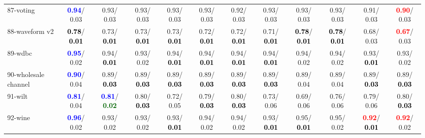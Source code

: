 \begin{table}[h]
\begin{center}
{\begin{tabular}{lc|c|c|c|c|c|c|c|c|c|c}
87-voting & \textcolor{blue}{\textbf{  0.94}}/  0.03 &   0.93/  0.03 &   0.93/  0.03 &   0.93/  0.03 &   0.93/  0.03 &   0.92/  0.03 &   0.93/  0.03 &   0.93/  0.03 &   0.93/  0.03 &   0.91/  0.03 & \textcolor{red}{\textbf{  0.90}}/  0.03 \\
88-waveform v2 & \textcolor{black}{\textbf{  0.78}}/\textcolor{black}{\textbf{  0.01}} &   0.73/\textcolor{black}{\textbf{  0.01}} &   0.73/\textcolor{black}{\textbf{  0.01}} &   0.73/\textcolor{black}{\textbf{  0.01}} &   0.72/\textcolor{black}{\textbf{  0.01}} &   0.72/\textcolor{black}{\textbf{  0.01}} &   0.71/\textcolor{black}{\textbf{  0.01}} & \textcolor{black}{\textbf{  0.78}}/\textcolor{black}{\textbf{  0.01}} & \textcolor{black}{\textbf{  0.78}}/\textcolor{black}{\textbf{  0.01}} &   0.68/  0.03 & \textcolor{red}{\textbf{  0.67}}/  0.03 \\
89-wdbc & \textcolor{blue}{\textbf{  0.95}}/  0.02 &   0.94/\textcolor{black}{\textbf{  0.01}} &   0.93/  0.02 &   0.94/\textcolor{black}{\textbf{  0.01}} &   0.94/\textcolor{black}{\textbf{  0.01}} &   0.94/\textcolor{black}{\textbf{  0.01}} &   0.94/\textcolor{black}{\textbf{  0.01}} &   0.94/  0.02 &   0.94/  0.02 &   0.93/\textcolor{black}{\textbf{  0.01}} &   0.93/  0.02 \\
90-wholesale channel & \textcolor{blue}{\textbf{  0.90}}/  0.04 &   0.89/\textcolor{black}{\textbf{  0.03}} &   0.89/\textcolor{black}{\textbf{  0.03}} &   0.89/\textcolor{black}{\textbf{  0.03}} &   0.89/\textcolor{black}{\textbf{  0.03}} &   0.89/\textcolor{black}{\textbf{  0.03}} &   0.89/\textcolor{black}{\textbf{  0.03}} &   0.89/  0.04 &   0.89/  0.04 &   0.89/\textcolor{black}{\textbf{  0.03}} &   0.89/\textcolor{black}{\textbf{  0.03}} \\
91-wilt & \textcolor{blue}{\textbf{  0.81}}/  0.04 & \textcolor{blue}{\textbf{  0.81}}/\textcolor{darkgreen}{\textbf{  0.02}} &   0.80/\textcolor{black}{\textbf{  0.03}} &   0.72/  0.05 &   0.79/\textcolor{black}{\textbf{  0.03}} &   0.80/\textcolor{black}{\textbf{  0.03}} &   0.73/  0.06 &   0.69/  0.06 &   0.76/  0.06 &   0.79/  0.06 &   0.80/\textcolor{black}{\textbf{  0.03}} \\
92-wine & \textcolor{blue}{\textbf{  0.96}}/  0.02 &   0.93/  0.02 &   0.93/  0.02 &   0.93/\textcolor{black}{\textbf{  0.01}} &   0.94/  0.02 &   0.94/  0.02 &   0.93/\textcolor{black}{\textbf{  0.01}} &   0.95/\textcolor{black}{\textbf{  0.01}} &   0.95/  0.02 & \textcolor{red}{\textbf{  0.92}}/\textcolor{black}{\textbf{  0.01}} & \textcolor{red}{\textbf{  0.92}}/  0.02 \\ \hline

\end{tabular}}
\end{center}
\end{table}
